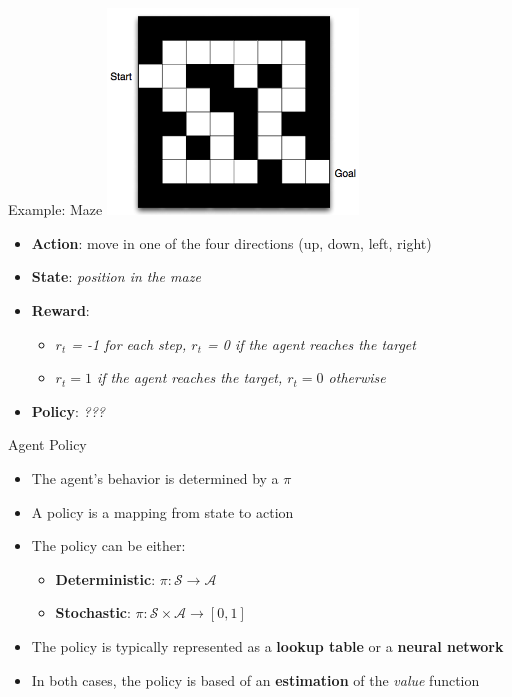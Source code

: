 \documentclass[presentation, 9pt]{beamer}\mode<presentation>{\usetheme{AMSBolognaFC}}
\begin{document}
\begin{frame}{Example: Maze}
\centering
\includegraphics[width=0.5\textwidth]{img/maze.png}

\begin{itemize}
	\item \textbf{Action}: move in one of the four directions (up, down, left, right)
	\item \textbf{State}: \emph{position in the maze}
	\item \textbf{Reward}: 
	\begin{itemize}
		\item \emph{$r_t$ = -1 for each step, $r_t$ = 0 if the agent reaches the target}
		\item \emph{$r_t = 1$ if the agent reaches the target, $r_t = 0$ otherwise}
	\end{itemize}
	\item \textbf{Policy}: \emph{???}
\end{itemize}
\end{frame}
\begin{frame}{Agent Policy}
\begin{itemize}
	\item The agent's behavior is determined by a  $\pi$
	\item A policy is a mapping from state to action
	\item The policy can be either:
	\begin{itemize}
		\item \textbf{Deterministic}: $\pi: \mathcal{S} \rightarrow \mathcal{A}$
		\item \textbf{Stochastic}: $\pi: \mathcal{S} \times \mathcal{A} \rightarrow [0,1]$
	\end{itemize}
	\item The policy is typically represented as a \textbf{lookup table} or a \textbf{neural network}
	\item In both cases, the policy is based of an \textbf{estimation} of the \emph{value} function
\end{itemize}
\end{frame}
\end{document}
